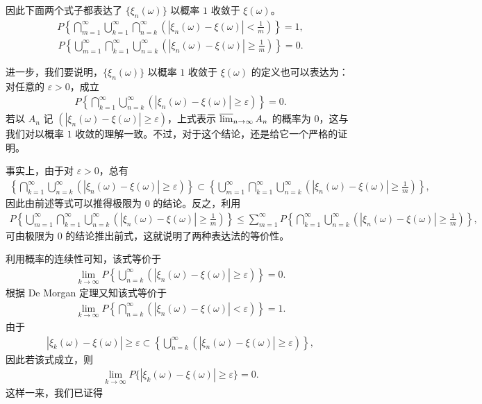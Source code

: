 \documentclass[../../main.tex]{subfiles}
\begin{document}
因此下面两个式子都表达了 $\{\xi_n(\omega)\}$ 以概率 $1$ 收敛于 $\xi(\omega)$。
\begin{align}
P\!\left\{\bigcap_{m=1}^{\infty}\bigcup_{k=1}^{\infty}\bigcap_{n=k}^{\infty}\left(|\xi_n(\omega)-\xi(\omega)|<\frac1m\right)\right\}=1,
\end{align}
\begin{align}
P\!\left\{\bigcup_{m=1}^{\infty}\bigcap_{k=1}^{\infty}\bigcup_{n=k}^{\infty}\left(|\xi_n(\omega)-\xi(\omega)|\geqslant\frac1m\right)\right\}=0.
\end{align}

进一步，我们要说明，$\{\xi_n(\omega)\}$ 以概率 $1$ 收敛于 $\xi(\omega)$ 的定义也可以表达为：对任意的 $\varepsilon>0$，成立
\begin{align}
P\!\left\{\bigcap_{k=1}^{\infty}\bigcup_{n=k}^{\infty}\left(|\xi_n(\omega)-\xi(\omega)|\geqslant\varepsilon\right)\right\}=0.
\end{align}
若以 $A_n$ 记 $(|\xi_n(\omega)-\xi(\omega)|\geqslant\varepsilon)$，上式表示 $\varlimsup_{n\to\infty}A_n$ 的概率为 $0$，这与我们对以概率 $1$ 收敛的理解一致。不过，对于这个结论，还是给它一个严格的证明。

事实上，由于对 $\varepsilon>0$，总有
\begin{align*}
\left\{\bigcap_{k=1}^{\infty}\bigcup_{n=k}^{\infty}\left(|\xi_n(\omega)-\xi(\omega)|\geqslant\varepsilon\right)\right\}
\subset\left\{\bigcup_{m=1}^{\infty}\bigcap_{k=1}^{\infty}\bigcup_{n=k}^{\infty}\left(|\xi_n(\omega)-\xi(\omega)|\geqslant\frac1m\right)\right\},
\end{align*}
因此由前述等式可以推得极限为 $0$ 的结论。反之，利用
\begin{align*}
P\!\left\{\bigcup_{m=1}^{\infty}\bigcap_{k=1}^{\infty}\bigcup_{n=k}^{\infty}\left(|\xi_n(\omega)-\xi(\omega)|\geqslant\frac1m\right)\right\}
\leqslant\sum_{m=1}^{\infty}P\!\left\{\bigcap_{k=1}^{\infty}\bigcup_{n=k}^{\infty}\left(|\xi_n(\omega)-\xi(\omega)|\geqslant\frac1m\right)\right\},
\end{align*}
可由极限为 $0$ 的结论推出前式，这就说明了两种表达法的等价性。

利用概率的连续性可知，该式等价于
\begin{align}
\lim_{k\to\infty}P\!\left\{\bigcup_{n=k}^{\infty}\left(|\xi_n(\omega)-\xi(\omega)|\geqslant\varepsilon\right)\right\}=0.
\end{align}
根据 De Morgan 定理又知该式等价于
\begin{align}
\lim_{k\to\infty}P\!\left\{\bigcap_{n=k}^{\infty}\left(|\xi_n(\omega)-\xi(\omega)|<\varepsilon\right)\right\}=1.
\end{align}
由于
\begin{align*}
|\xi_k(\omega)-\xi(\omega)|\geqslant\varepsilon\subset\left\{\bigcup_{n=k}^{\infty}\left(|\xi_n(\omega)-\xi(\omega)|\geqslant\varepsilon\right)\right\},
\end{align*}
因此若该式成立，则
\begin{align*}
\lim_{k\to\infty}P\{|\xi_k(\omega)-\xi(\omega)|\geqslant\varepsilon\}=0.
\end{align*}
这样一来，我们已证得
\end{document}

